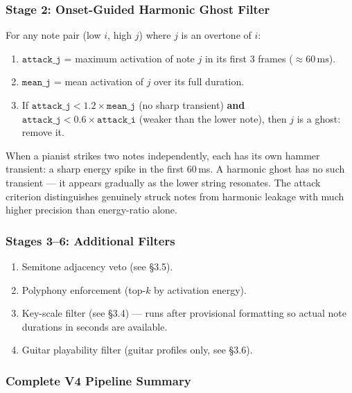 \documentclass[12pt, a4paper]{article}
\begin{document}
\subsubsection{Stage 2: Onset-Guided Harmonic Ghost Filter}

For any note pair (low $i$, high $j$) where $j$ is an overtone of $i$:
\begin{enumerate}[leftmargin=2em]
  \item $\texttt{attack\_j}$ = maximum activation of note $j$ in its first
        3 frames ($\approx 60\,\text{ms}$).
  \item $\texttt{mean\_j}$ = mean activation of $j$ over its full duration.
  \item If $\texttt{attack\_j} < 1.2 \times \texttt{mean\_j}$ (no sharp
        transient) \textbf{and}
        $\texttt{attack\_j} < 0.6 \times \texttt{attack\_i}$ (weaker than
        the lower note), then $j$ is a ghost: remove it.
\end{enumerate}

\begin{notebox}
  When a pianist strikes two notes independently, each has its own hammer
  transient: a sharp energy spike in the first 60\,ms. A harmonic ghost
  has no such transient --- it appears gradually as the lower string resonates.
  The attack criterion distinguishes genuinely struck notes from harmonic
  leakage with much higher precision than energy-ratio alone.
\end{notebox}

\subsubsection{Stages 3--6: Additional Filters}

\begin{enumerate}[leftmargin=2em]
  \item Semitone adjacency veto (see \S3.5).
  \item Polyphony enforcement (top-$k$ by activation energy).
  \item Key-scale filter (see \S3.4) --- runs after provisional formatting
        so actual note durations in seconds are available.
  \item Guitar playability filter (guitar profiles only, see \S3.6).
\end{enumerate}

\subsubsection{Complete V4 Pipeline Summary}
\end{document}
